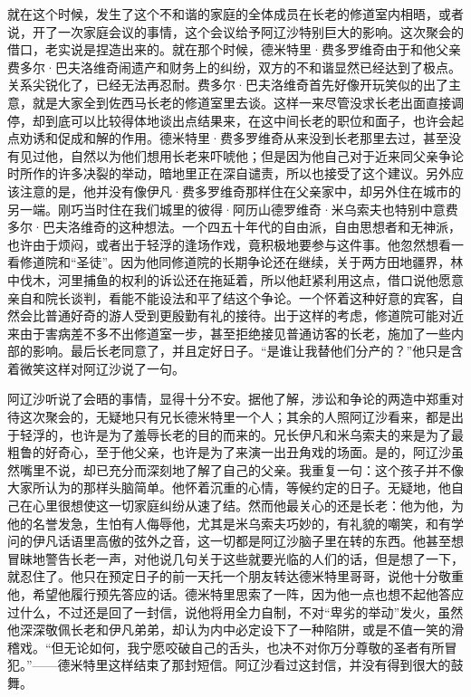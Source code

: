 \par 就在这个时候，发生了这个不和谐的家庭的全体成员在长老的修道室内相晤，或者说，开了一次家庭会议的事情，这个会议给予阿辽沙特别巨大的影响。这次聚会的借口，老实说是捏造出来的。就在那个时候，德米特里·费多罗维奇由于和他父亲费多尔·巴夫洛维奇闹遗产和财务上的纠纷，双方的不和谐显然已经达到了极点。关系尖锐化了，已经无法再忍耐。费多尔·巴夫洛维奇首先好像开玩笑似的出了主意，就是大家全到佐西马长老的修道室里去谈。这样一来尽管没求长老出面直接调停，却到底可以比较得体地谈出点结果来，在这中间长老的职位和面子，也许会起点劝诱和促成和解的作用。德米特里·费多罗维奇从来没到长老那里去过，甚至没有见过他，自然以为他们想用长老来吓唬他；但是因为他自己对于近来同父亲争论时所作的许多决裂的举动，暗地里正在深自谴责，所以也接受了这个建议。另外应该注意的是，他并没有像伊凡·费多罗维奇那样住在父亲家中，却另外住在城市的另一端。刚巧当时住在我们城里的彼得·阿历山德罗维奇·米乌索夫也特别中意费多尔·巴夫洛维奇的这种想法。一个四五十年代的自由派，自由思想者和无神派，也许由于烦闷，或者出于轻浮的逢场作戏，竟积极地要参与这件事。他忽然想看一看修道院和“圣徒”。因为他同修道院的长期争论还在继续，关于两方田地疆界，林中伐木，河里捕鱼的权利的诉讼还在拖延着，所以他赶紧利用这点，借口说他愿意亲自和院长谈判，看能不能设法和平了结这个争论。一个怀着这种好意的宾客，自然会比普通好奇的游人受到更殷勤有礼的接待。出于这样的考虑，修道院可能对近来由于害病差不多不出修道室一步，甚至拒绝接见普通访客的长老，施加了一些内部的影响。最后长老同意了，并且定好日子。“是谁让我替他们分产的？”他只是含着微笑这样对阿辽沙说了一句。
\par 阿辽沙听说了会晤的事情，显得十分不安。据他了解，涉讼和争论的两造中郑重对待这次聚会的，无疑地只有兄长德米特里一个人；其余的人照阿辽沙看来，都是出于轻浮的，也许是为了羞辱长老的目的而来的。兄长伊凡和米乌索夫的来是为了最粗鲁的好奇心，至于他父亲，也许是为了来演一出丑角戏的场面。是的，阿辽沙虽然嘴里不说，却已充分而深刻地了解了自己的父亲。我重复一句：这个孩子并不像大家所认为的那样头脑简单。他怀着沉重的心情，等候约定的日子。无疑地，他自己在心里很想使这一切家庭纠纷从速了结。然而他最关心的还是长老：他为他，为他的名誉发急，生怕有人侮辱他，尤其是米乌索夫巧妙的，有礼貌的嘲笑，和有学问的伊凡话语里高傲的弦外之音，这一切都是阿辽沙脑子里在转的东西。他甚至想冒昧地警告长老一声，对他说几句关于这些就要光临的人们的话，但是想了一下，就忍住了。他只在预定日子的前一天托一个朋友转达德米特里哥哥，说他十分敬重他，希望他履行预先答应的话。德米特里思索了一阵，因为他一点也想不起他答应过什么，不过还是回了一封信，说他将用全力自制，不对“卑劣的举动”发火，虽然他深深敬佩长老和伊凡弟弟，却认为内中必定设下了一种陷阱，或是不值一笑的滑稽戏。“但无论如何，我宁愿咬破自己的舌头，也决不对你万分尊敬的圣者有所冒犯。”——德米特里这样结束了那封短信。阿辽沙看过这封信，并没有得到很大的鼓舞。

